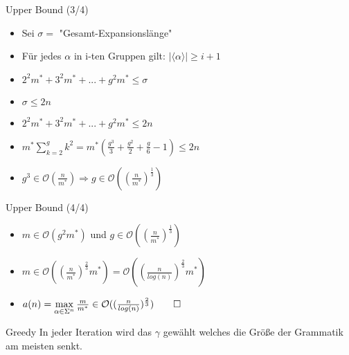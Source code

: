 \begin{frame}{\FrameName}
	\begin{block}{Upper Bound (3/4)}
    \begin{itemize}[<+->]
      \item Sei $\sigma = $ "Gesamt-Expansionslänge"
      \item Für jedes $\alpha$ in i-ten Gruppen gilt: $|\langle \alpha \rangle | \ge i+1$ 
      \item $2^2m^* + 3^2m^* + ... + g^2m^* \le \sigma$
      \item $\sigma \le 2n$
      \item $2^2m^* + 3^2m^* + ... + g^2m^* \le 2n$
      \item $m^* \sum_{k=2}^{g}k^2 = m^* (\frac{g^3}{3} + \frac{g^2}{2} + \frac{g}{6} - 1) \le 2n$
      \item $g^3 \in \mathcal{O}(\frac{n}{m^*}) \Rightarrow g \in \mathcal{O}((\frac{n}{m^*})^{\frac{1}{3}})$
    \end{itemize}
\end{block}
\end{frame}

\begin{frame}{\FrameName}
	\begin{block}{Upper Bound (4/4)}
    \begin{itemize}[<+->]
      \item $m\in \mathcal{O}(g^2 m^*)$ und $g \in \mathcal{O}((\frac{n}{m^*})^{\frac{1}{3}})$
      \item $m \in \mathcal{O}((\frac{n}{m^*})^{\frac{2}{3}} m^*) = \mathcal{O}((\frac{n}{log (n)})^{\frac{2}{3}} m^*)$
      \item $a(n) = \max\limits_{\alpha \in \Sigma^n} \frac{m}{m^*} \in \mathcal{O}((\frac{n}{log(n)})^{\frac{2}{3}}) \qed$
    \end{itemize}
\end{block}
\end{frame}

\begin{frame}{\FrameName}
	\begin{block}{Greedy}
    \Gap
    In jeder Iteration wird das $\gamma $ gewählt welches die Größe der Grammatik am meisten senkt.
\end{block}
\end{frame}

